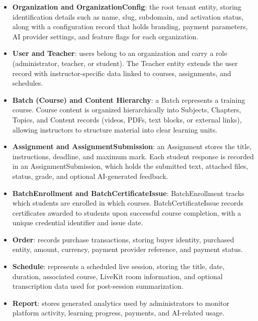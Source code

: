 \begin{itemize}

  \item \textbf{Organization and OrganizationConfig}: the root tenant entity, storing
        identification details such as name, slug, subdomain, and activation status, along
        with a configuration record that holds branding, payment parameters, AI provider
        settings, and feature flags for each organization.

  \item \textbf{User and Teacher}: users belong to an organization and carry a role
        (administrator, teacher, or student). The Teacher entity extends the user record
        with instructor-specific data linked to courses, assignments, and schedules.

  \item \textbf{Batch (Course) and Content Hierarchy}: a Batch represents a training
        course. Course content is organized hierarchically into Subjects, Chapters, Topics,
        and Content records (videos, PDFs, text blocks, or external links), allowing
        instructors to structure material into clear learning units.

  \item \textbf{Assignment and AssignmentSubmission}: an Assignment stores the title,
        instructions, deadline, and maximum mark. Each student response is recorded in an
        AssignmentSubmission, which holds the submitted text, attached files, status,
        grade, and optional AI-generated feedback.

  \item \textbf{BatchEnrollment and BatchCertificateIssue}: BatchEnrollment tracks which
        students are enrolled in which courses. BatchCertificateIssue records certificates
        awarded to students upon successful course completion, with a unique credential
        identifier and issue date.

  \item \textbf{Order}: records purchase transactions, storing buyer identity, purchased
        entity, amount, currency, payment provider reference, and payment status.

  \item \textbf{Schedule}: represents a scheduled live session, storing the title,
        date, duration, associated course, LiveKit room information, and optional
        transcription data used for post-session summarization.

  \item \textbf{Report}: stores generated analytics used by administrators to monitor
        platform activity, learning progress, payments, and AI-related usage.

\end{itemize}


